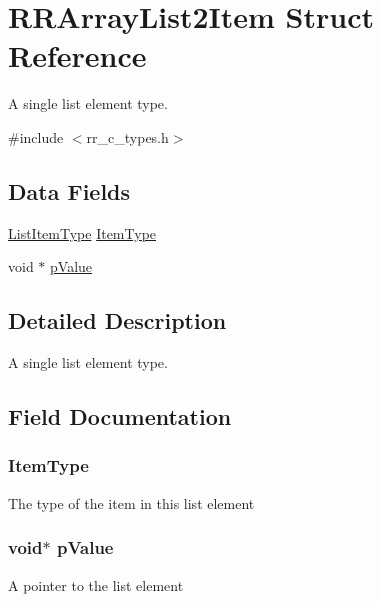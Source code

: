 \hypertarget{struct_r_r_array_list2_item}{
\section{\-R\-R\-Array\-List2\-Item \-Struct \-Reference}
\label{struct_r_r_array_list2_item}
}


\-A single list element type.  




{\ttfamily \#include $<$rr\-\_\-c\-\_\-types.\-h$>$}

\subsection*{\-Data \-Fields}
\begin{DoxyCompactItemize}
\item 
\hyperlink{rr__c__types_8h_ab99437ab2e88aa90b7ebb8add042b25e}{\-List\-Item\-Type} \hyperlink{struct_r_r_array_list2_item_af69273b36c37b84e5c91a0c9d1af3a15}{\-Item\-Type}
\item 
void $\ast$ \hyperlink{struct_r_r_array_list2_item_a63ad54c993b6ca0d76f718dc1a1164c3}{p\-Value}
\end{DoxyCompactItemize}


\subsection{\-Detailed \-Description}
\-A single list element type. 

\subsection{\-Field \-Documentation}
\hypertarget{struct_r_r_array_list2_item_af69273b36c37b84e5c91a0c9d1af3a15}{
\subsubsection[{\-Item\-Type}]{ {\bf \-Item\-Type}}}
\label{struct_r_r_array_list2_item_af69273b36c37b84e5c91a0c9d1af3a15}
\-The type of the item in this list element \hypertarget{struct_r_r_array_list2_item_a63ad54c993b6ca0d76f718dc1a1164c3}{
\subsubsection[{p\-Value}]{\setlength{\rightskip}{0pt plus 5cm}void$\ast$ {\bf p\-Value}}}
\label{struct_r_r_array_list2_item_a63ad54c993b6ca0d76f718dc1a1164c3}
\-A pointer to the list element 

